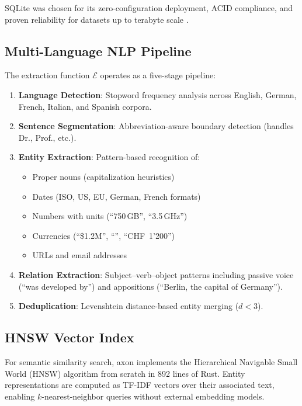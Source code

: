 \documentclass[11pt,twocolumn]{article}
\begin{document}
SQLite was chosen for its zero-configuration deployment, ACID compliance, and proven reliability for datasets up to terabyte scale \citep{sqlite2020}.

\subsection{Multi-Language NLP Pipeline}

The extraction function $\mathcal{E}$ operates as a five-stage pipeline:

\begin{enumerate}
  \item \textbf{Language Detection}: Stopword frequency analysis across English, German, French, Italian, and Spanish corpora.
  \item \textbf{Sentence Segmentation}: Abbreviation-aware boundary detection (handles Dr., Prof., etc.).
  \item \textbf{Entity Extraction}: Pattern-based recognition of:
    \begin{itemize}
      \item Proper nouns (capitalization heuristics)
      \item Dates (ISO, US, EU, German, French formats)
      \item Numbers with units (``750\,GB'', ``3.5\,GHz'')
      \item Currencies (``\$1.2M'', ``'', ``CHF~1'200'')
      \item URLs and email addresses
    \end{itemize}
  \item \textbf{Relation Extraction}: Subject--verb--object patterns including passive voice (``was developed by'') and appositions (``Berlin, the capital of Germany'').
  \item \textbf{Deduplication}: Levenshtein distance-based entity merging ($d < 3$).
\end{enumerate}

\subsection{HNSW Vector Index}

For semantic similarity search, axon implements the Hierarchical Navigable Small World (HNSW) algorithm \citep{malkov2018efficient} from scratch in 892 lines of Rust. Entity representations are computed as TF-IDF vectors over their associated text, enabling $k$-nearest-neighbor queries without external embedding models.
\end{document}
